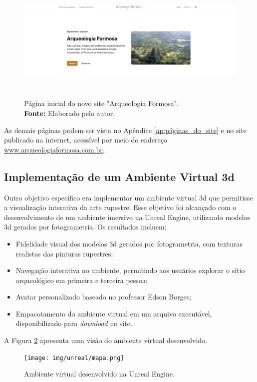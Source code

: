 \begin{figure}[H]
    \centering
    \includegraphics[height=6cm, keepaspectratio]{img/site/hero1.png}
    \caption{Página inicial do novo site "Arqueologia Formosa". \\
    \textbf{Fonte:} Elaborado pelo autor.}
    \label{fig:site_homepage}
\end{figure}

As demais páginas podem ser vista no Apêndice \ref{ap:páginas_do_site} e no site publicado na internet, acessível por meio do endereço \url{www.arqueologiaformosa.com.br}.
\subsection{Implementação de um Ambiente Virtual \gls{3d}}
Outro objetivo específico era implementar um ambiente virtual \gls{3d} que permitisse a visualização interativa da arte rupestre. Esse objetivo foi alcançado com o desenvolvimento de um ambiente imersivo na Unreal Engine, utilizando modelos \gls{3d} gerados por fotogrametria. Os resultados incluem:
\begin{itemize}
    \item Fidelidade visual dos modelos \gls{3d} gerados por fotogrametria, com texturas realistas das pinturas rupestres;
    \item Navegação interativa no ambiente, permitindo aos usuários explorar o sítio arqueológico em primeira e terceira pessoa;
    \item Avatar personalizado baseado no professor Edson Borges;
    \item Empacotamento do ambiente virtual em um arquivo executável, disponibilizado para \textit{download} no site.
\end{itemize}

A Figura \ref{fig:virtual_environment} apresenta uma visão do ambiente virtual desenvolvido.

\begin{figure}[H]
    \centering
    \texttt{[image: img/unreal/mapa.png]}
    \caption{Ambiente virtual desenvolvido na Unreal Engine.}
    \label{fig:virtual_environment}
\end{figure}


